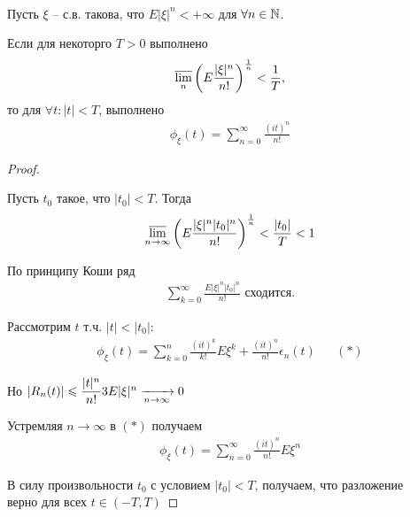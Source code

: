 \begin{theorem}~

  Пусть $\xi$ -- с.в. такова, что $E |\xi|^n < +\infty$ для $\forall n \in \mathbb{N}$.

  Если для некоторго $T > 0$ выполнено
  \begin{align*}
    \varlimsup\limits_n \left(  E \frac{|\xi|^n}{n!}  \right)^{\frac{1}{n}} < \frac{1}{T},
  \end{align*}
  то для $\forall t: |t| < T$, выполнено
  \begin{align*}
    \phi_{\xi} (t) = \sum_{n = 0}^{\infty} \frac{(i t)^n}{n!}
  \end{align*}

\end{theorem}
 
\begin{proof}~
  
  Пусть $t_0$ такое, что $|t_0| < T$.
  Тогда
  \begin{align*}
    \varlimsup\limits_{n \to \infty} \left(  E \frac{|\xi|^n |t_0|^n}{n!}  \right)^{\frac{1}{n}} 
    < \frac{|t_0|}{T} < 1
  \end{align*}

  По принципу Коши ряд
  \begin{align*}
    \sum_{k = 0}^{\infty} \frac{E |\xi|^n |t_0|^n}{n!} \text{ сходится.}
  \end{align*}

  Рассмотрим $t$ т.ч. $|t| < |t_0|:$
  \begin{align*}
    \phi_{\xi} (t) = \sum_{k = 0}^{n} \frac{(i t)^k}{k!} E \xi^k + \frac{(i t)^n}{n!} \epsilon_n (t)
    &&(*)
  \end{align*}
  
  Но $|R_n(t)| \leqslant \dfrac{|t|^n}{n!} 3 E |\xi|^n \xrightarrow[n \to \infty]{} 0$

  Устремляя $n \to \infty$ в $(*)$ получаем
  \begin{align*}
    \phi_{\xi} (t) = \sum_{n = 0}^{\infty} \frac{(i t)^n}{n!} E \xi^n
  \end{align*}

  В силу произвольности $t_0$ с условием $|t_0| < T$, получаем, что разложение \\
  верно для всех $t \in (-T, T)$
\end{proof}

